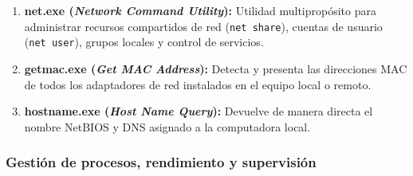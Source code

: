 \documentclass[12pt]{article}
\begin{document}
\begin{enumerate}[leftmargin=*, noitemsep, topsep=1pt]
    \item \textbf{net.exe (\textit{Network Command Utility}):} Utilidad multipropósito para administrar recursos compartidos de red (\texttt{net share}), cuentas de usuario (\texttt{net user}), grupos locales y control de servicios.
    \item \textbf{getmac.exe (\textit{Get MAC Address}):} Detecta y presenta las direcciones MAC de todos los adaptadores de red instalados en el equipo local o remoto.
    \item \textbf{hostname.exe (\textit{Host Name Query}):} Devuelve de manera directa el nombre NetBIOS y DNS asignado a la computadora local.
\end{enumerate}

\subsubsection{Gestión de procesos, rendimiento y supervisión}
\end{document}
